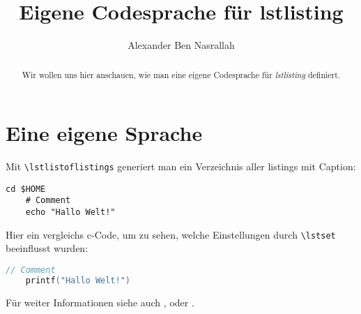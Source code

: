 \documentclass[a4paper]{article}
\title{Eigene Codesprache für lstlisting}
\author{Alexander Ben Nasrallah}
\begin{document}
\maketitle
\begin{abstract}
	Wir wollen uns hier anschauen, wie man eine eigene Codesprache für
	\emph{lstlisting} definiert.
\end{abstract}

\section{Eine eigene Sprache}
Mit \verb+\lstlistoflistings+ generiert man ein Verzeichnis aller listings mit
Caption:
\lstlistoflistings

\begin{lstlisting}[language=cli, title=Titel, caption={Command line}]
	cd $HOME
	# Comment
	echo "Hallo Welt!"
\end{lstlisting}

Hier ein vergleichs c-Code, um zu sehen, welche Einstellungen durch
\verb+\lstset+ beeinflusst wurden:
\begin{lstlisting}[language=C, caption={c-Code mit Standardeinstellungen}]
	// Comment
	printf("Hallo Welt!")
\end{lstlisting}

Für weiter Informationen siehe auch \cite{ctanListings}, \cite{wikiListings} oder \cite{manListings}.

\printbibliography
\end{document}
